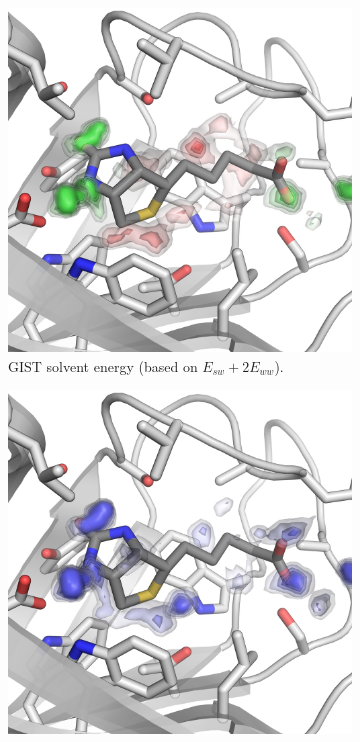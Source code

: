 \documentclass[9pt,tutorial]{livecoms}
\begin{document}
\begin{figure}
	\centering
	\begin{subfigure}[b]{0.45\textwidth}
	\includegraphics[width=\linewidth]{figures/binding_pocket_E.png}
	\caption{GIST solvent energy (based on $E_{sw} + 2E_{ww}$).}
	\label{fig-binding-pocket-energy}
    \end{subfigure}
	\hfill
	\begin{subfigure}[b]{0.45\textwidth}
		\includegraphics[width=\linewidth]{figures/binding_pocket_S.png}

\end{subfigure}
\end{figure}
\end{document}
